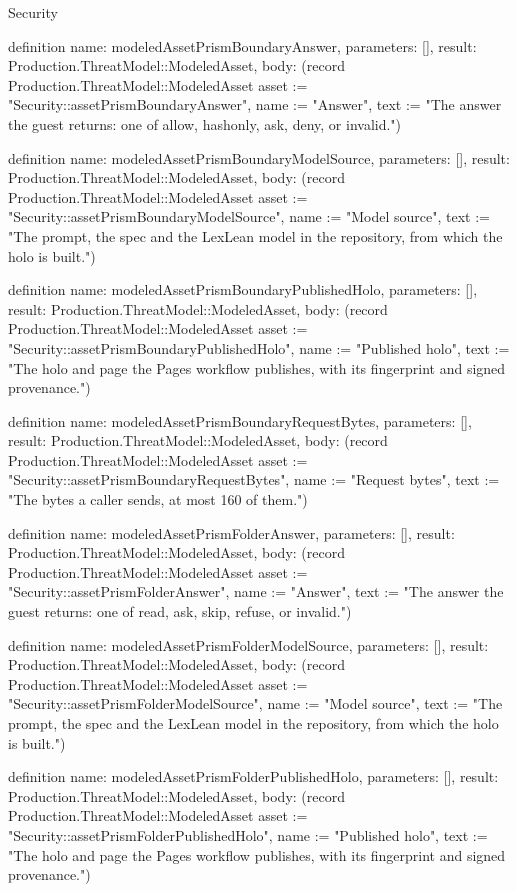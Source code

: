 \begin{lexlean}{Security}
\begin{semanticmodule}
definition{
  name: modeledAssetPrismBoundaryAnswer,
  parameters: [],
  result: Production.ThreatModel::ModeledAsset,
  body: (record Production.ThreatModel::ModeledAsset {asset := "Security::assetPrismBoundaryAnswer", name := "Answer", text := "The answer the guest returns: one of allow, hashonly, ask, deny, or invalid."})
}

definition{
  name: modeledAssetPrismBoundaryModelSource,
  parameters: [],
  result: Production.ThreatModel::ModeledAsset,
  body: (record Production.ThreatModel::ModeledAsset {asset := "Security::assetPrismBoundaryModelSource", name := "Model source", text := "The prompt, the spec and the LexLean model in the repository, from which the holo is built."})
}

definition{
  name: modeledAssetPrismBoundaryPublishedHolo,
  parameters: [],
  result: Production.ThreatModel::ModeledAsset,
  body: (record Production.ThreatModel::ModeledAsset {asset := "Security::assetPrismBoundaryPublishedHolo", name := "Published holo", text := "The holo and page the Pages workflow publishes, with its fingerprint and signed provenance."})
}

definition{
  name: modeledAssetPrismBoundaryRequestBytes,
  parameters: [],
  result: Production.ThreatModel::ModeledAsset,
  body: (record Production.ThreatModel::ModeledAsset {asset := "Security::assetPrismBoundaryRequestBytes", name := "Request bytes", text := "The bytes a caller sends, at most 160 of them."})
}

definition{
  name: modeledAssetPrismFolderAnswer,
  parameters: [],
  result: Production.ThreatModel::ModeledAsset,
  body: (record Production.ThreatModel::ModeledAsset {asset := "Security::assetPrismFolderAnswer", name := "Answer", text := "The answer the guest returns: one of read, ask, skip, refuse, or invalid."})
}

definition{
  name: modeledAssetPrismFolderModelSource,
  parameters: [],
  result: Production.ThreatModel::ModeledAsset,
  body: (record Production.ThreatModel::ModeledAsset {asset := "Security::assetPrismFolderModelSource", name := "Model source", text := "The prompt, the spec and the LexLean model in the repository, from which the holo is built."})
}

definition{
  name: modeledAssetPrismFolderPublishedHolo,
  parameters: [],
  result: Production.ThreatModel::ModeledAsset,
  body: (record Production.ThreatModel::ModeledAsset {asset := "Security::assetPrismFolderPublishedHolo", name := "Published holo", text := "The holo and page the Pages workflow publishes, with its fingerprint and signed provenance."})
}


\end{semanticmodule}
\end{lexlean}
